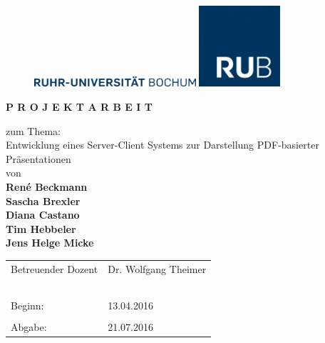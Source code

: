 \thispagestyle{empty}


\begin{figure}[t]
\vspace{-3cm}
\begin{minipage}[t]{3cm}
\vspace{-2cm}
\includegraphics[width=6cm]{Deckblatt/Wortmarke_RUB.jpg}
\end{minipage}
\hfill
\begin{minipage}[t]{3cm}
\includegraphics[width=3cm]{Deckblatt/Label_RUB.jpg}
\end{minipage}
\vspace{3cm}
\end{figure}


\renewcommand{\rmdefault}{phv}
\begin{center}


	{\Huge \bf P R O J E K T A R B E I T}
	
	\vspace{0.5cm}
	
	{\Large
	zum Thema:\\
	\vspace{0.5cm}
	Entwicklung eines Server-Client Systems zur Darstellung PDF-basierter Präsentationen\\
	\vspace{0.5cm}
	von\\
	\vspace{0.5cm}
	{\LARGE \bf
	René Beckmann\\
	Sascha Brexler\\
	Diana Castano\\
	Tim Hebbeler\\
	Jens Helge Micke\\
	}
	\vspace{0.5cm}
	}
\end{center}

\begin{table}[h!]
\begin{tabular}{p{}p{}}
Betreuender Dozent & Dr. Wolfgang Theimer\\
&\\
&\\
&\\
&\\
&\\
Beginn: & 13.04.2016\\
&\\
Abgabe: & 21.07.2016\\
\end{tabular}
\end{table}

\renewcommand{\rmdefault}{ptm}